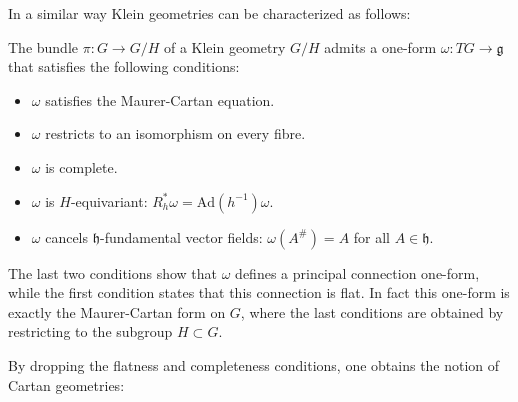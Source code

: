     In a similar way Klein geometries can be characterized as follows:
    \begin{property}
        The bundle $\pi:G\rightarrow G/H$ of a Klein geometry $G/H$ admits a one-form $\omega:TG\rightarrow\mathfrak{g}$ that satisfies the following conditions:
        \begin{itemize}
            \item $\omega$ satisfies the Maurer-Cartan equation.
            \item $\omega$ restricts to an isomorphism on every fibre.
            \item $\omega$ is complete.
            \item $\omega$ is $H$-equivariant: $R_h^*\omega=\mathrm{Ad}(h^{-1})\omega$.
            \item $\omega$ cancels $\mathfrak{h}$-fundamental vector fields: $\omega(A^\#)=A$ for all $A\in\mathfrak{h}$.
        \end{itemize}
    \end{property}
    The last two conditions show that $\omega$ defines a principal connection one-form, while the first condition states that this connection is flat. In fact this one-form is exactly the Maurer-Cartan form on $G$, where the last conditions are obtained by restricting to the subgroup $H\subset G$.

    By dropping the flatness and completeness conditions, one obtains the notion of Cartan geometries:

